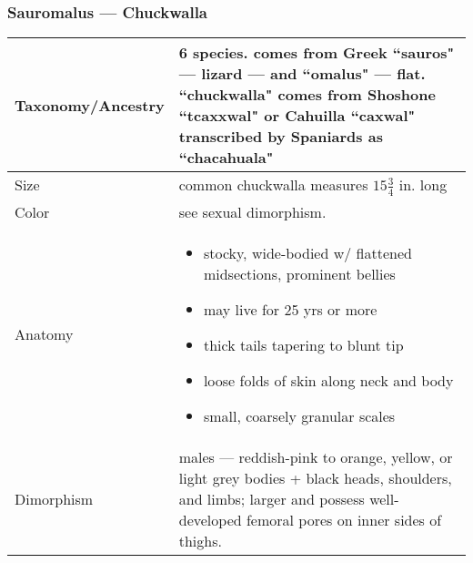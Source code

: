 \subsubsection{Sauromalus --- Chuckwalla} 
\begin{center}
\begin{longtabu} to 

	\hline
	Taxonomy/Ancestry &
	6 species. comes from Greek ``sauros" --- lizard --- and ``omalus" --- flat. ``chuckwalla" comes from Shoshone ``tcaxxwal" or Cahuilla ``caxwal" transcribed by Spaniards as ``chacahuala"
	
	 \\
	\hline
	Size & 
	common chuckwalla measures $15 \frac{3}{4}$ in. long
	\\
	\hline
	Color &
	see sexual dimorphism.
	 \\
	\hline
	Anatomy &
	\begin{itemize}[noitemsep]
		\item stocky, wide-bodied w/ flattened midsections, prominent bellies
		\item may live for 25 yrs or more
		\item thick tails tapering to blunt tip
		\item loose folds of skin along neck and body
		\item small, coarsely granular scales
	\end{itemize}
	 \\
	\hline
	Dimorphism & 
	males --- reddish-pink to orange, yellow, or light grey bodies + black heads, shoulders, and limbs; larger and possess well-developed femoral pores on inner sides of thighs.
	

\end{longtabu}
\end{center}
